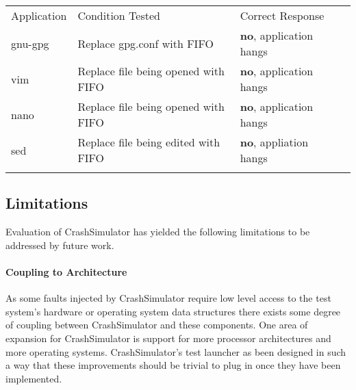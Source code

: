             \begin{table}[H]
                \scriptsize{}
                \begin{tabular}{l  l  l  l}
                \toprule{}
                  Application & Condition Tested & Correct Response\\
                  gnu-gpg & Replace gpg.conf with FIFO & \textbf{no}, application hangs\\
                  vim & Replace file being opened with FIFO & \textbf{no}, application hangs\\
                  nano & Replace file being opened with FIFO & \textbf{no}, application hangs\\
                  sed & Replace file being edited with FIFO & \textbf{no}, appliation hangs\\
                \bottomrule{}
                \end{tabular}
            \end{table}
        
        
        

    \subsection{Limitations}

        Evaluation of CrashSimulator has yielded the following limitations to be addressed by future work.

        \paragraph{Coupling to Architecture}

            As some faults injected by CrashSimulator require low level access to the test system's hardware or
            operating system data structures there exists some degree of coupling between CrashSimulator and these
            components. One area of expansion for CrashSimulator is support for more processor architectures and more
            operating systems.  CrashSimulator's test launcher as been designed in such a way that these improvements
            should be trivial to plug in once they have been implemented.
